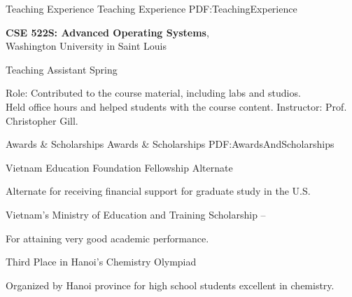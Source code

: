 \documentclass[letterpaper,MMMyyyy,nonstopmode]{simpleresumecv}
\begin{document}
\begin{Body}

\endgroup

\Section
{Teaching \newline Experience}
{Teaching \newline Experience}
{PDF:TeachingExperience}

\Entry
{\textbf{CSE 522S: Advanced Operating Systems}}, \\
Washington University in Saint Louis

\BulletItem Teaching Assistant \hfill Spring~
\begin{Detail}
\SubBulletItem Role: Contributed to the course material, including labs and studios. \\
Held office hours and helped students with the course content. 
\SubBulletItem Instructor: Prof. Christopher Gill.
\end{Detail}


\Section
{Awards \&\newline
Scholarships}
{Awards \& Scholarships}
{PDF:AwardsAndScholarships}

\BulletItem
Vietnam Education Foundation Fellowship Alternate
\hfill
{}
\begin{Detail}
\Item
Alternate for receiving financial support for graduate study in the U.S.
\end{Detail}

\Gap
\BulletItem
Vietnam's Ministry of Education and Training Scholarship 
\hfill
{} -- 
\begin{Detail}
\Item
For attaining very good academic performance. 
\end{Detail}

\Gap
\BulletItem
Third Place in Hanoi's Chemistry Olympiad
\hfill
{}
\begin{Detail}
\Item
Organized by Hanoi province for high school students excellent in chemistry.
\end{Detail}


\end{Body}
\end{document}

